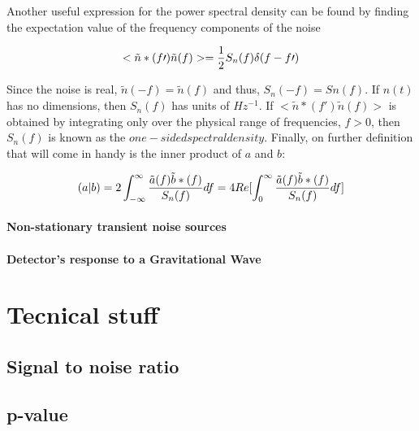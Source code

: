 \documentclass[binding=0.6cm, LaM]{sapthesis}
\begin{document}
	Another useful expression for the power spectral density can be found by finding 
	the expectation value of the frequency components of the noise

		\begin{equation}
		<\tilde{n}\ast(f\prime)\tilde{n}(f)>  = {1 \over 2} S_n(f) \delta (f-f\prime)
		\end{equation}

	Since the noise is real, $\tilde{n}(-f) = \tilde{n}(f)$ and thus, $S_n(−f) = Sn(f)$. 
	If $n(t)$ has no dimensions, then $S_n(f)$ has units of $Hz^{-1}$.
 	If $<\tilde{n}\ast(f\prime)\tilde{n}(f)> $ is obtained by integrating only over the physical
	range of frequencies, $f > 0$, then $S_n(f)$ is known as the $one-sided spectral density$.
	Finally, on further definition that will come in handy is the inner product of $a$ and $b$:


		\begin{equation}
		(a|b) = 2 \int^{\infty}_{-\infty} {{\tilde{a}(f)\tilde{b}\ast(f)} \over {S_n(f)}}df = 4 Re [\int^{\infty}_{0}{{\tilde{a}(f)\tilde{b}\ast(f)} \over {S_n(f)}} df]
		\end{equation}


\subsubsection{Non-stationary transient noise sources}



\subsubsection{Detector’s response to a Gravitational Wave}

\chapter{Tecnical stuff}

\section{Signal to noise ratio}

\section{p-value}
\end{document}
